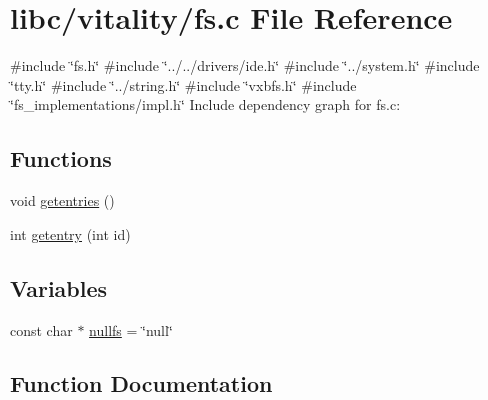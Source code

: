 \hypertarget{a00149}{}\section{libc/vitality/fs.c File Reference}
\label{a00149}
{\ttfamily \#include \char`\"{}fs.\+h\char`\"{}}\newline
{\ttfamily \#include \char`\"{}../../drivers/ide.\+h\char`\"{}}\newline
{\ttfamily \#include \char`\"{}../system.\+h\char`\"{}}\newline
{\ttfamily \#include \char`\"{}tty.\+h\char`\"{}}\newline
{\ttfamily \#include \char`\"{}../string.\+h\char`\"{}}\newline
{\ttfamily \#include \char`\"{}vxbfs.\+h\char`\"{}}\newline
{\ttfamily \#include \char`\"{}fs\+\_\+implementations/impl.\+h\char`\"{}}\newline
Include dependency graph for fs.\+c\+:
\subsection*{Functions}
\begin{DoxyCompactItemize}
\item 
void \hyperlink{a00149_a414110036132977c34813673360e1a63_a414110036132977c34813673360e1a63}{getentries} ()
\item 
int \hyperlink{a00149_a3fb32d07d3bd05144a196c94fc59c0d1_a3fb32d07d3bd05144a196c94fc59c0d1}{getentry} (int id)
\end{DoxyCompactItemize}
\subsection*{Variables}
\begin{DoxyCompactItemize}
\item 
const char $\ast$ \hyperlink{a00149_a36265ac74fd925405e1179e799961f1e_a36265ac74fd925405e1179e799961f1e}{nullfs} = \char`\"{}null\char`\"{}
\end{DoxyCompactItemize}


\subsection{Function Documentation}
\mbox{\label{a00149_a414110036132977c34813673360e1a63_a414110036132977c34813673360e1a63}} 
